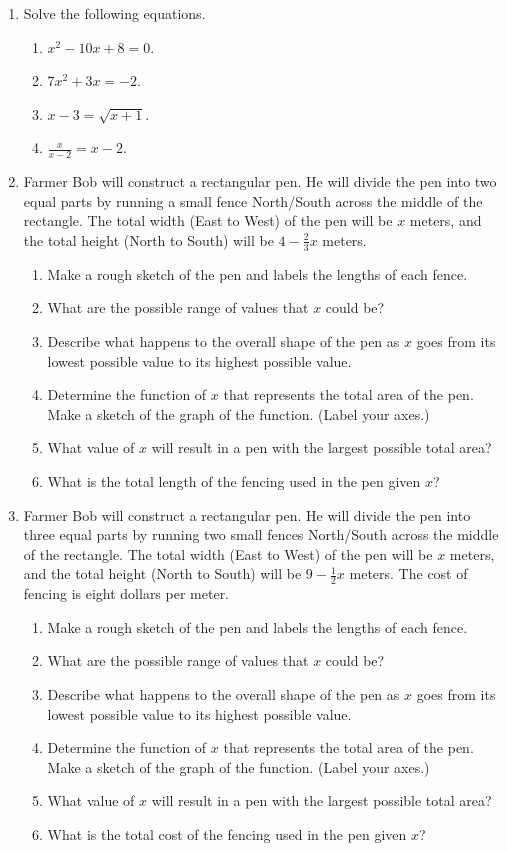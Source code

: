 \begin{enumerate}
\item Solve the following equations.
\begin{enumerate}
\item $x^2-10x+8=0$.
\item $7x^2+3x=-2$.
\item $x-3=\sqrt{x+1}$.
\item $\frac{x}{x-2}=x-2$.
\end{enumerate}

\item Farmer Bob will construct a rectangular pen. He will divide the
  pen into two equal parts by running a small fence North/South across
  the middle of the rectangle. The total width (East to West) of the
  pen will be $x$ meters, and the total height (North to South) will
  be $4-\frac{2}{3}x$ meters.
  \begin{enumerate}
  \item Make a rough sketch of the pen and labels the lengths of each
    fence.
  \item What are the possible range of values that $x$ could be?
  \item Describe what happens to the overall shape of the pen as $x$
    goes from its lowest possible value to its highest possible value.
  \item Determine the function of $x$ that represents the total area
    of the pen. Make a sketch of the graph of the function. (Label
    your axes.)
  \item What value of $x$ will result in a pen with the largest
    possible total area?
  \item What is the total length of the fencing used in the pen given
    $x$?
  \end{enumerate}


\item Farmer Bob will construct a rectangular pen. He will divide the
  pen into three equal parts by running two small fences North/South
  across the middle of the rectangle. The total width (East to West)
  of the pen will be $x$ meters, and the total height (North to South)
  will be $9-\frac{1}{2}x$ meters. The cost of fencing is eight
  dollars per meter.
  \begin{enumerate}
  \item Make a rough sketch of the pen and labels the lengths of each
    fence.
  \item What are the possible range of values that $x$ could be?
  \item Describe what happens to the overall shape of the pen as $x$
    goes from its lowest possible value to its highest possible value.
  \item Determine the function of $x$ that represents the total area
    of the pen. Make a sketch of the graph of the function. (Label
    your axes.)
  \item What value of $x$ will result in a pen with the largest
    possible total area?
  \item What is the total cost of the fencing used in the pen given
    $x$?
  \end{enumerate}

\end{enumerate}
